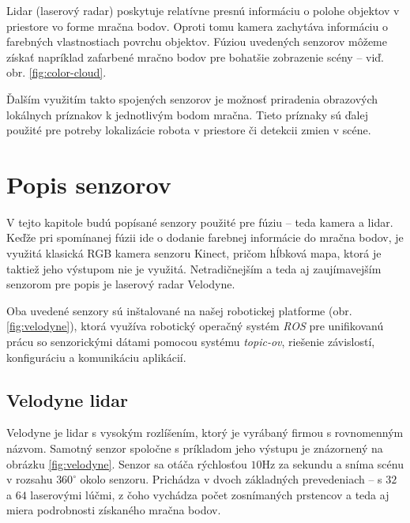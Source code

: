 \documentclass[12pt, a4paper]{article}
\begin{document}
Lidar (laserový radar) poskytuje relatívne presnú informáciu o polohe objektov v priestore vo forme mračna bodov. Oproti tomu kamera zachytáva informáciu o farebných vlastnostiach povrchu objektov. Fúziou uvedených senzorov môžeme získať napríklad zafarbené mračno bodov pre bohatšie zobrazenie scény -- viď. obr. \ref{fig:color-cloud}.

Ďalším využitím takto spojených senzorov je možnosť priradenia obrazových lokálnych príznakov k jednotlivým bodom mračna. Tieto príznaky sú ďalej použité pre potreby lokalizácie robota v priestore či detekcii zmien v scéne.



\section{Popis senzorov}
V tejto kapitole budú popísané senzory použité pre fúziu -- teda kamera a lidar. Keďže pri spomínanej fúzii ide o dodanie farebnej informácie do mračna bodov, je využitá klasická RGB kamera senzoru Kinect, pričom hĺbková mapa, ktorá je taktiež jeho výstupom nie je využitá. Netradičnejším a teda aj zaujímavejším senzorom pre popis je laserový radar Velodyne. 

Oba uvedené senzory sú inštalované na našej robotickej platforme (obr. \ref{fig:velodyne}), ktorá využíva robotický operačný systém \emph{ROS} pre unifikovanú prácu so senzorickými dátami pomocou systému \emph{topic-ov}, riešenie závislostí, konfiguráciu a komunikáciu aplikácií.

\subsection{Velodyne lidar}

Velodyne je lidar s vysokým rozlíšením, ktorý je vyrábaný firmou s rovnomenným názvom\cite{velodyne}. Samotný senzor spoločne s príkladom jeho výstupu je znázornený na obrázku \ref{fig:velodyne}. Senzor sa otáča rýchlosťou $10$Hz za sekundu a sníma scénu v rozsahu $360^{\circ}$ okolo senzoru. Prichádza v dvoch základných prevedeniach -- s $32$ a $64$ laserovými lúčmi, z čoho vychádza počet zosnímaných prstencov a teda aj miera podrobnosti získaného mračna bodov.
\end{document}
